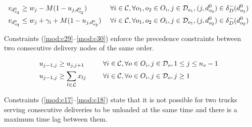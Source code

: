 \documentclass{article}
\begin{document}
\begin{alignat}{3}
  \label{mod:c14} & v_{d^0_{o_2}} \geq w_j - M(1- u_{j,d^0_{o_2}}) & \text{} & \forall i \in \mathcal{C}, \forall o_1, o_2 \in O_i, j \in \mathcal{D}_{o_1}, (j,d^0_{o_2}) \in \delta_{D}^{-}(d^0_{o_2})  \\
  \label{mod:c15} &  v_{d^0_{o_2}}  \leq  w_j + \gamma_i + M(1- u_{j,d^0_{o_2}}) & \hspace{1mm} & \forall i \in \mathcal{C}, \forall o_1, o_2 \in O_i, j \in \mathcal{D}_{o_1}, (j,d^0_{o_2}) \in \delta_{D}^{-}(d^0_{o_2}) 
\end{alignat}

Constraints (\ref{mod:c29}--\ref{mod:c30}) enforce the precedence constraints between two consecutive delivery nodes of the same order.

\begin{alignat}{3}
\label{mod:c29}   &   u_{j-1,j} \geq u_{j,j+1} & \hspace{5mm} & \forall i \in \mathcal{C}, \forall o \in O_i,  j \in \mathcal{D}_{o}, 1 \leq j \leq n_o-1\\
  \label{mod:c30} &  u_{j-1,j} \geq \sum_{l \in \mathcal{L}}{x_{lj}} & \text{} & \forall i \in \mathcal{C}, \forall o \in O_i, j \in \mathcal{D}_{o}, j \geq 1 
\end{alignat}

Constraints (\ref{mod:c17}--\ref{mod:c18}) state that it is not possible for two trucks serving consecutive deliveries to be unloaded at the same time and there is a maximum time lag between them.
\end{document}
